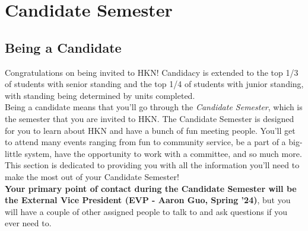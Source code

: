 \documentclass[11pt, article, oneside]{memoir}
\begin{document}

    \newpage
    \chapter{Candidate Semester}
    \label{ch:candidate-semester}

    \section{Being a Candidate}
    \label{sec:being-a-candidate}
        Congratulations on being invited to HKN!
        Candidacy is extended to the top 1/3 of students with senior standing and the top 1/4 of students with junior standing, with standing being determined by units completed. \\
        
        Being a candidate means that you'll go through the \emph{Candidate Semester}, which is the semester that you are invited to HKN.
        The Candidate Semester is designed for you to learn about HKN and have a bunch of fun meeting people.
        You'll get to attend many events ranging from fun to community service, be a part of a big-little system, have the opportunity to work with a committee, and so much more.
        This section is dedicated to providing you with all the information you'll need to make the most out of your Candidate Semester! \\

        \textbf{Your primary point of contact during the Candidate Semester will be the External Vice President (EVP - Aaron Guo, Spring '24)}, but you will have a couple of other assigned people to talk to and ask questions if you ever need to.
\end{document}
